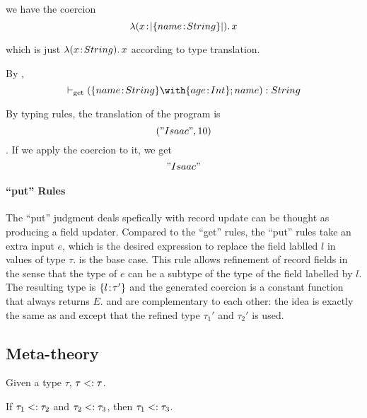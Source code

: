   we have the coercion
  \[ \lambda (x \!:\! \lvert \{ name \!:\! String \} \rvert).\, x \]

  which is just $ \lambda (x \!:\! String).\, x $ according to type translation.

  By ,
  \[ \turnsget (\RecTy {name} {String} \Intersect \RecTy {age} {Int}; {name}) : String \]


  By typing rules, the translation of the program is
  \[ ("Isaac", 10) \]. If we apply the coercion to it, we get
  \[ "Isaac" \]


\paragraph{``put'' Rules}

  The ``put'' judgment deals spefically with record update can be thought as
  producing a field updater. Compared to the ``get'' rules, the ``put'' rules
  take an extra input $ e $, which is the desired expression to replace the
  field lablled $ l $ in values of type $ \tau $.  is the base
  case. This rule allows refinement of record fields in the sense that the type
  of $ e $ can be a subtype of the type of the field labelled by $ l $. The
  resulting type is $ \{ l \!:\! \tau' \} $ and the generated coercion is a
  constant function that always returns $ E $.  and
   are complementary to each other: the idea is exactly the
  same as  and  except that the refined type
  $ \tau_1' $ and $ \tau_2' $ is used.

\subsection{Meta-theory}

\begin{lemma} \label{sub-refl}
Given a type $ \tau $, $ \tau <: \tau $.
\end{lemma}

\begin{lemma} \label{sub-trans}
If $ \tau_1 <: \tau_2 $ and $ \tau_2 <: \tau_3 $,
then $ \tau_1 <: \tau_3 $.
\end{lemma}

